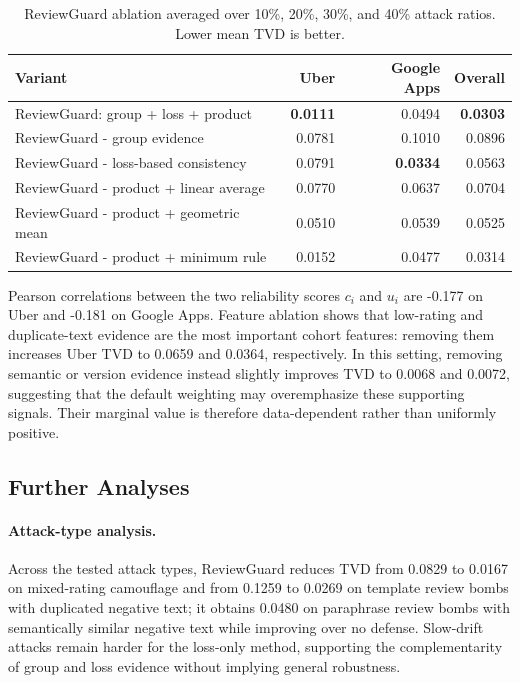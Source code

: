 \documentclass[runningheads]{llncs}
\begin{document}
\begin{table}
\centering
\caption{ReviewGuard ablation averaged over 10\%, 20\%, 30\%, and 40\% attack ratios. Lower mean TVD is better.}
\label{tab:formula}
\begin{tabular}{lrrr}
\toprule
Variant & Uber & Google Apps & Overall\\
\midrule
ReviewGuard: group + loss + product & \textbf{0.0111} & 0.0494 & \textbf{0.0303}\\
ReviewGuard - group evidence & 0.0781 & 0.1010 & 0.0896\\
ReviewGuard - loss-based consistency & 0.0791 & \textbf{0.0334} & 0.0563\\
ReviewGuard - product + linear average & 0.0770 & 0.0637 & 0.0704\\
ReviewGuard - product + geometric mean & 0.0510 & 0.0539 & 0.0525\\
ReviewGuard - product + minimum rule & 0.0152 & 0.0477 & 0.0314\\
\bottomrule
\end{tabular}
\end{table}

Pearson correlations between the two reliability scores \(c_i\) and \(u_i\) are -0.177 on Uber and -0.181 on Google Apps. Feature ablation shows that low-rating and duplicate-text evidence are the most important cohort features: removing them increases Uber TVD to 0.0659 and 0.0364, respectively. In this setting, removing semantic or version evidence instead slightly improves TVD to 0.0068 and 0.0072, suggesting that the default weighting may overemphasize these supporting signals. Their marginal value is therefore data-dependent rather than uniformly positive.

\subsection{Further Analyses}

\paragraph{Attack-type analysis.}
Across the tested attack types, ReviewGuard reduces TVD from 0.0829 to 0.0167 on mixed-rating camouflage and from 0.1259 to 0.0269 on template review bombs with duplicated negative text; it obtains 0.0480 on paraphrase review bombs with semantically similar negative text while improving over no defense. Slow-drift attacks remain harder for the loss-only method, supporting the complementarity of group and loss evidence without implying general robustness.
\end{document}
